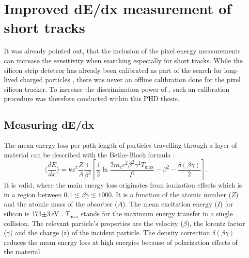 \section{Improved dE/dx measurement of short tracks}
\label{sec:DeDxMeasurement}
It was already pointed out, that the inclusion of the pixel energy measurements can increase the sensitivity when searching especially for short tracks.
While the silicon strip detetcor has already been calibrated as part of the search for long-lived charged particles \cite{bib:CMS:HSCP_8TeV}, there was never an offline calibration done for the pixel silicon tracker.
To increase the discrimination power of \dedx, such an calibration procedure was therefore conducted within this PHD thesis.
 
\subsection{Measuring dE/dx}
The mean energy loss per path length of particles travelling through a layer of material can be described with the Bethe-Bloch formula \cite{bib:Bethe_1930,bib:Bloch_1933}:
\begin{equation}
\langle \frac{dE}{dx} \rangle = kz^2\frac{Z}{A}\frac{1}{\beta^2} [ \frac{1}{2} \ln{\frac{2m_e c^2 \beta^2 \gamma^2 T_{\text{max}}}{I^2}} - \beta^2 - \frac{\delta( \beta \gamma )}{2} ].
\end{equation}
It is valid, where the main energy loss originates from ionization effects which is in a region between $0.1\lesssim\beta\gamma\lesssim 1000$.
It is a function of the atomic number ($Z$) and the atomic mass of the absorber ($A$). 
The mean excitation energy ($I$) for silicon is 173$\pm$3\,eV \cite{?}. 
$T_{\text{max}}$ stands for the maximum energy transfer in a single collision.
The relevant particle's properties are the velocity ($\beta$), the lorentz factor ($\gamma$) and the charge (z) of the incident particle.
The density correction $\delta( \beta \gamma )$ reduces the mean energy loss at high energies because of polarization effects of the material.

